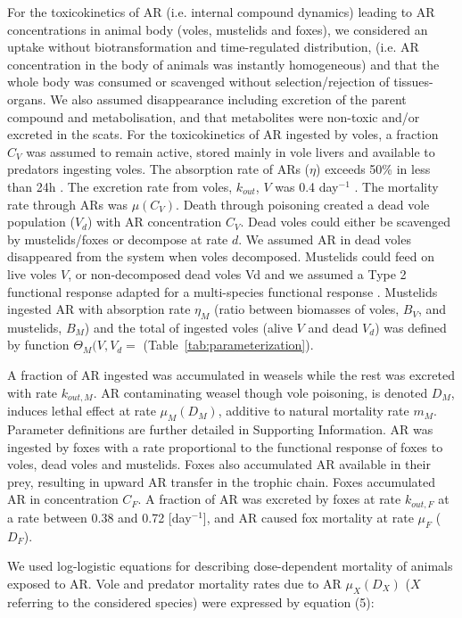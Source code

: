 \documentclass[11pt]{article}
\begin{document}
For the toxicokinetics of AR (i.e. internal compound dynamics) leading to AR concentrations in animal body (voles, mustelids and foxes), we considered an uptake without biotransformation and time-regulated distribution, (i.e. AR concentration in the body of animals was instantly homogeneous) and that the whole body was consumed or scavenged without selection/rejection of tissues-organs. We also assumed disappearance including excretion of the parent compound and metabolisation, and that metabolites were non-toxic and/or excreted in the scats. 
For the toxicokinetics of AR ingested by voles, a fraction $C_V$ was assumed to remain active, stored mainly in vole livers and available to predators ingesting voles. The absorption rate of ARs ($\eta$) exceeds 50\% in less than 24h \citep{Jacquot2013}. The excretion rate from voles, $k_{out}$, $V$ was 0.4 day$^{-1}$ \citep{Sage2008}. The mortality rate through ARs was $\mu(C_V)$. Death through poisoning created a dead vole population ($V_d$) with AR concentration $C_V$. Dead voles could either be scavenged by mustelids/foxes or decompose at rate $d$. We assumed AR in dead voles disappeared from the system when voles decomposed. 
Mustelids could feed on live voles $V$, or non-decomposed dead voles Vd and we assumed a Type 2 functional response adapted for a multi-species functional response \citep{Baudrot2016}. Mustelids ingested AR with absorption rate $\eta_M$ (ratio between biomasses of voles, $B_V$, and mustelids, $B_M$) and the total of ingested voles (alive $V$ and dead $V_d$) was defined by function $\Theta_M (V,V_d=$ (Table~\ref{tab:parameterization}).

A fraction of AR ingested was accumulated in weasels while the rest was excreted with rate $k_{out,M}$.
%
AR contaminating weasel though vole poisoning, is denoted $D_M$, induces lethal effect at rate $\mu_M(D_M)$, additive to natural mortality rate $m_M$. Parameter definitions are further detailed in Supporting Information.
%
AR was ingested by foxes with a rate proportional to the functional response of foxes to voles, dead voles and mustelids.
%
Foxes also accumulated AR available in their prey, resulting in upward AR transfer in the trophic chain. Foxes accumulated AR in concentration $C_F$. A fraction of AR was excreted by foxes at rate $k_{out,F}$ at a rate between 0.38 and 0.72 [day$^{-1}$]\citep{Sage2010}, and AR caused fox mortality at rate $\mu_F$ ($D_F$).

We used log-logistic equations for describing dose-dependent mortality of animals exposed to AR. Vole and predator mortality rates due to AR $\mu_X(D_X)$ ($X$ referring to the considered species) were expressed by equation (5):
\end{document}
